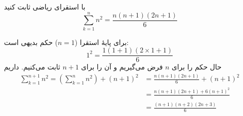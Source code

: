 با استقرای ریاضی ثابت کنید
$$
\sum_{k=1}^{n}n^2=\frac{n(n+1)(2n+1)}{6}
$$
\begin{ans}
  برای پایهٔ استقرا ($n=1$) حکم بدیهی است:
  $$
  1^2 = \frac{1(1+1)(2\times 1+1)}{6}
  $$
  حال حکم را برای $n$ فرض می‌گیریم و آن را برای $n+1$ ثابت می‌کنیم. داریم
  \begin{align*}
  \sum_{k=1}^{n+1}n^2=(\sum_{k=1}^{n}n^2)+(n+1)^2&=\frac{n(n+1)(2n+1)}{6}+(n+1)^2\\
  &=\frac{n(n+1)(2n+1)+6(n+1)^2}{6}\\
  &=\frac{(n+1)(n+2)(2n+3)}{6}
  \end{align*}
\end{ans}
